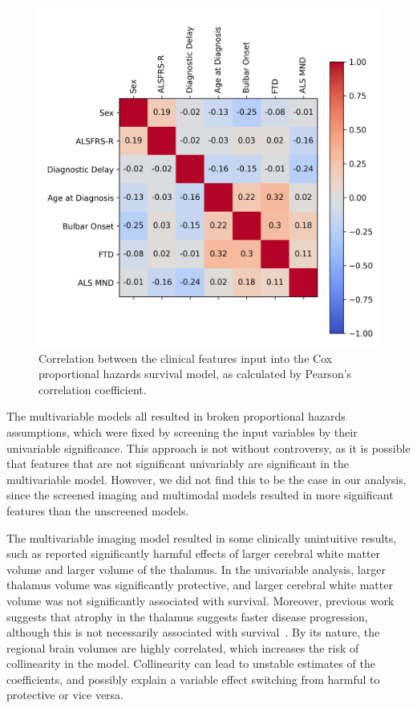 \begin{figure}
    \centering
    \includegraphics[width=0.75\linewidth]{figures/clinical_correlation}
    \caption{Correlation between the clinical features input into the Cox proportional hazards survival model, as calculated by Pearson's correlation coefficient.}
    \label{fig:clinicalcorrelation}
\end{figure}

The multivariable models all resulted in broken proportional hazards assumptions, which were fixed by screening the input variables by their univariable significance.
This approach is not without controversy, as it is possible that features that are not significant univariably are significant in the multivariable model.
However, we did not find this to be the case in our analysis, since the screened imaging and multimodal models resulted in more significant features than the unscreened models.

The multivariable imaging model resulted in some clinically unintuitive results, such as reported significantly harmful effects of larger cerebral white matter volume and larger volume of the thalamus.
In the univariable analysis, larger thalamus volume was significantly protective, and larger cerebral white matter volume was not significantly associated with survival.
Moreover, previous work suggests that atrophy in the thalamus suggests faster disease progression, although this is not necessarily associated with survival~\cite{sendaStructuralMRICorrelates2017,dieckmannCorticalSubcorticalGrey2022}.
By its nature, the regional brain volumes are highly correlated, which increases the risk of collinearity in the model.
Collinearity can lead to unstable estimates of the coefficients, and possibly explain a variable effect switching from harmful to protective or vice versa.

